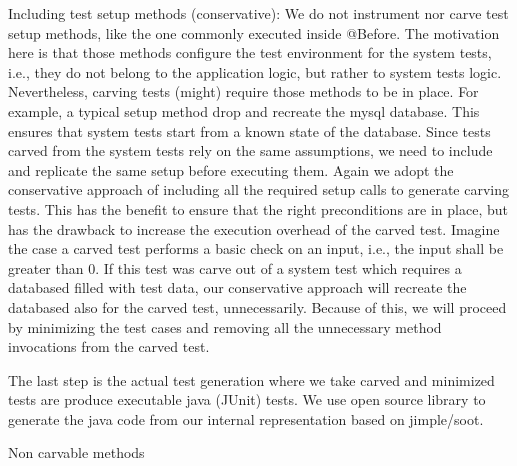 \documentclass[10pt,conference]{IEEEtran}
\begin{document}
Including test setup methods (conservative): We do not instrument nor carve test setup methods, like the one commonly executed inside @Before.
The motivation here is that those methods configure the test environment for the system tests, i.e., they do not belong to the application logic,
but rather to system tests logic. Nevertheless, carving tests (might) require those methods to be in place. For example, a typical setup method drop and recreate the mysql database. This ensures that system tests start from a known state of the database. Since tests carved from the system tests rely on the same assumptions, we need to include and replicate the same setup before executing them. Again we adopt the conservative approach of including all the required setup calls to generate carving tests. This has the benefit to ensure that the right preconditions are in place, but has the drawback to increase the execution overhead of the carved test. Imagine the case a carved test performs a basic check on an input, i.e., the input shall be greater than 0. If this test was carve out of a system test which requires a databased filled with test data, our conservative approach will recreate the databased also for the carved test, unnecessarily. Because of this, we will proceed by minimizing the test cases and removing all the unnecessary method invocations from the carved test.

The last step is the actual test generation where we take carved and minimized tests are produce executable java (JUnit) tests. We use open source library to generate the java code from our internal representation based on jimple/soot.


Non carvable methods
\end{document}
